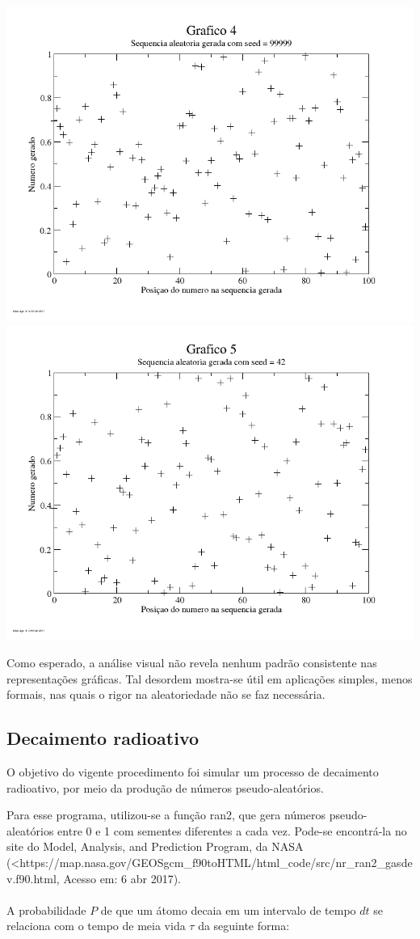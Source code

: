 \documentclass{article}
\begin{document}
\includegraphics[width=\textwidth]{graf4}
\includegraphics[width=\textwidth]{graf5}

Como esperado, a análise visual não revela nenhum padrão consistente nas representações gráficas. Tal desordem mostra-se útil em aplicações simples, menos formais, nas quais o rigor na aleatoriedade não se faz necessária.

\subsection{Decaimento radioativo}
O objetivo do vigente procedimento foi simular um processo de decaimento radioativo, por meio da produção de números pseudo-aleatórios.\par
Para esse programa, utilizou-se a função ran2, que gera números pseudo-aleatórios entre 0 e 1 com sementes diferentes a cada vez. Pode-se encontrá-la no site do Model, Analysis, and Prediction Program, da NASA (<https://map.nasa.gov/GEOSgcm_f90toHTML/html_code/src/nr_ran2_gasdev.f90.html\>, Acesso em: 6 abr 2017).\paragraph{}
A probabilidade $P$ de que um átomo decaia em um intervalo de tempo $dt$ se relaciona com o tempo de meia vida $\tau$ da seguinte forma:
\end{document}
